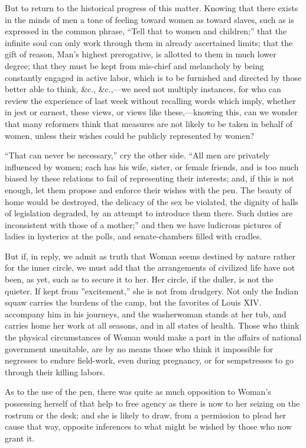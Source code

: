 But to return to the historical progress of this matter. Knowing that
there exists in the minds of men a tone of feeling toward women as
toward slaves, such as is expressed in the common phrase, ``Tell that
to women and children;'' that the infinite soul can only work through
them in already ascertained limits; that the gift of reason, Man's
highest prerogative, is allotted to them in much lower degree; that
they must be kept from mis-chief and melancholy by being
constantly engaged in active labor, which is to be furnished and
directed by those better able to think, \&c., \&c.,---we need not
multiply instances, for who can review the experience of last week
without recalling words which imply, whether in jest or earnest, these
views, or views like these,---know\-ing this, can we wonder that many
reformers think that measures are not likely to be taken in behalf of
women, unless their wishes could be publicly represented by women?

``That can never be necessary,'' cry the other side. ``All men are
privately influenced by women; each has his wife, sister, or female
friends, and is too much biased by these relations to fail of
representing their interests; and, if this is not enough, let them
propose and enforce their wishes with the pen. The beauty of home
would be destroyed, the delicacy of the sex be violated, the dignity
of halls of legislation degraded, by an attempt to introduce them
there. Such duties are inconsistent with those of a mother;'' and then
we have ludicrous pictures of ladies in hysterics at the polls, and
senate-chambers filled with cradles.

But if, in reply, we admit as truth that Woman seems destined by
nature rather for the inner circle, we must add that the arrangements
of civilized life have not been, as yet, such as to secure it to her.
Her circle, if the duller, is not the quieter. If kept from
''excitement,'' she is not from drudgery. Not only the Indian squaw
carries the burdens of the camp, but the favorites of Louis XIV.
accompany him in his journeys, and the  washerwoman stands at
her tub, and carries home her work at all seasons, and in all states
of health. Those who think the physical circumstances of Woman would
make a part in the affairs of national government unsuitable, are by
no means those who think it impossible for negresses to endure
field-work, even during pregnancy, or for sempstresses to go through
their killing labors.

As to the use of the pen, there was quite as much opposition to
Woman's possessing herself of that help to free agency as there is now
to her seizing on the rostrum or the desk; and she is likely to draw,
from a permission to plead her cause that way, opposite inferences to
what might be wished by those who now grant it.

